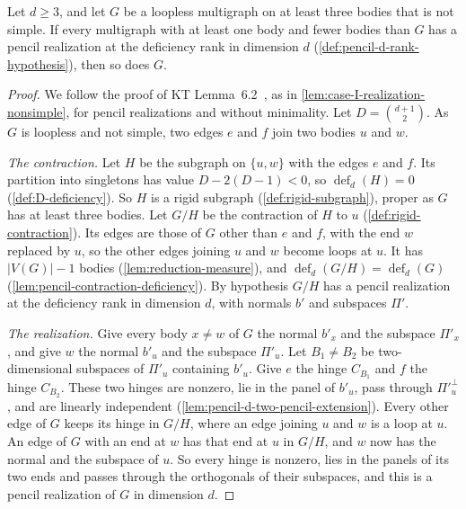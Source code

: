 \begin{lemma}
  \label{lem:pencil-d-nonsimple-case}
  \leanok
  Let $d \ge 3$, and let $G$ be a loopless multigraph on at least three
  bodies that is not simple. If every multigraph with at least one body
  and fewer bodies than $G$ has a pencil realization at the deficiency
  rank in dimension $d$ (\cref{def:pencil-d-rank-hypothesis}), then so
  does $G$.
\end{lemma}
\begin{proof}
  \leanok
  We follow the proof of KT Lemma~6.2~\cite[p.~673]{katohTanigawa2011},
  as in \cref{lem:case-I-realization-nonsimple}, for pencil realizations
  and without minimality. Let
  $D = \binom{d+1}{2}$. As $G$ is loopless and not simple, two edges $e$
  and $f$ join two bodies $u$ and $w$.

  \emph{The contraction.} Let $H$ be the subgraph on $\{u, w\}$ with the
  edges $e$ and $f$. Its partition into singletons has value
  $D - 2(D - 1) < 0$, so $\operatorname{def}_d(H) = 0$
  (\cref{def:D-deficiency}). So $H$ is a rigid subgraph
  (\cref{def:rigid-subgraph}), proper as $G$ has at least three bodies.
  Let $G/H$ be the contraction of $H$ to $u$
  (\cref{def:rigid-contraction}). Its edges are those of $G$ other than
  $e$ and $f$, with the end $w$ replaced by $u$, so the other edges
  joining $u$ and $w$ become loops at $u$. It has $|V(G)| - 1$ bodies
  (\cref{lem:reduction-measure}), and
  $\operatorname{def}_d(G/H) = \operatorname{def}_d(G)$
  (\cref{lem:pencil-contraction-deficiency}). By hypothesis $G/H$ has a
  pencil realization at the deficiency rank in dimension $d$, with
  normals $b'$ and subspaces $\Pi'$.

  \emph{The realization.} Give every body $x \neq w$ of $G$ the normal
  $b'_x$ and the subspace $\Pi'_x$, and give $w$ the normal $b'_u$ and
  the subspace $\Pi'_u$. Let $B_1 \neq B_2$ be two-dimensional subspaces
  of $\Pi'_u$ containing $b'_u$. Give $e$ the hinge $C_{B_1}$ and $f$ the
  hinge $C_{B_2}$. These two hinges are nonzero, lie in the panel of
  $b'_u$, pass through $\Pi'^{\perp}_u$, and are linearly independent
  (\cref{lem:pencil-d-two-pencil-extension}). Every other edge of $G$
  keeps its hinge in $G/H$, where an edge joining $u$ and $w$ is a loop
  at $u$. An edge of $G$ with an end at $w$ has that end at $u$ in
  $G/H$, and $w$ now has the normal and the subspace of $u$. So every
  hinge is nonzero, lies in the panels of its two ends and passes
  through the orthogonals of their subspaces, and this is a pencil
  realization of $G$ in dimension $d$.


\end{proof}
